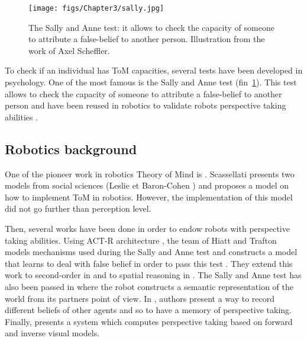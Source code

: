 \documentclass[english,a4paper,11pt,twoside]{StyleThese}
\begin{document}
\begin{figure}[!h]
	\centering
    \texttt{[image: figs/Chapter3/sally.jpg]}
    \caption{The Sally and Anne test: it allows to check the capacity of someone to attribute a false-belief to another person. Illustration from the work of Axel Scheffler.}
    \label{fig:sally}
\end{figure}

To check if an individual has ToM capacities, several tests have been developed in psychology. One of the most famous is the Sally and Anne test (fin~\ref{fig:sally}). This test allows to check the capacity of someone to attribute a false-belief to another person and have been reused in robotics to validate robots perspective taking abilities \cite{hiatt2010cognitive, milliez2014framework}.

\subsection{Robotics background}

One of the pioneer work in robotics Theory of Mind is \cite{scassellati2002theory}. Scassellati presents two models from social sciences (Leslie \cite{leslie1984spatiotemporal} et Baron-Cohen \cite{baron1997mindblindness}) and proposes a model on how to implement ToM in robotics. However, the implementation of this model did not go further than perception level.

Then, several works have been done in order to endow robots with perspective taking abilities. Using ACT-R architecture \cite{anderson2004integrated}, the team of Hiatt and Trafton models mechanisms used during the Sally and Anne test and constructs a model that learns to deal with false belief in order to pass this test \cite{hiatt2010cognitive}. They extend this work to second-order in \cite{hiatt2015understanding} and to spatial reasoning in \cite{hiatt2004cognitive}. The Sally and Anne test has also been passed in \cite{milliez2014framework} where the robot constructs a semantic representation of the world from its partners point of view. In \cite{berlin2006perspective}, authors present a way to record different beliefs of other agents and so to have a memory of perspective taking. Finally, \cite{johnson2005perspective} presents a system which computes perspective taking based on forward and inverse visual models.
\end{document}
